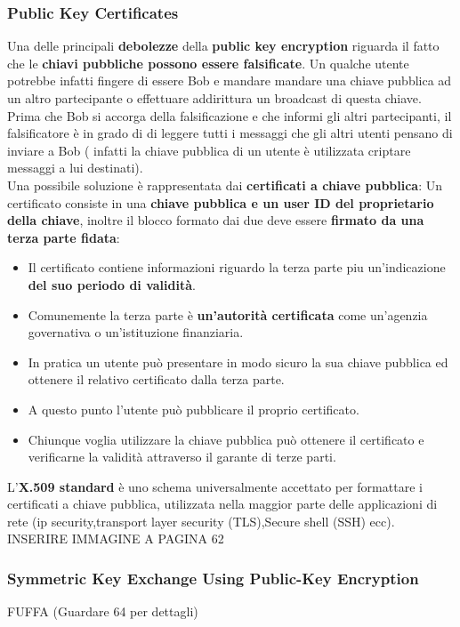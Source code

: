 \documentclass[12pt]{article}
\begin{document}
		\subsubsection{Public Key Certificates}
			Una delle principali \textbf{debolezze} della \textbf{public key encryption} riguarda il fatto che le \textbf{chiavi pubbliche possono essere falsificate}. Un qualche utente potrebbe infatti fingere di essere Bob e mandare mandare una chiave pubblica ad un altro partecipante o effettuare addirittura un broadcast di questa chiave. Prima che Bob si accorga della falsificazione e che informi gli altri partecipanti, il falsificatore è in grado di di leggere tutti i messaggi che gli altri utenti pensano di inviare a Bob ( infatti la chiave pubblica di un utente è utilizzata criptare messaggi a lui destinati).\\
			Una possibile soluzione è rappresentata dai \textbf{certificati a chiave pubblica}: Un certificato consiste in una \textbf{chiave pubblica e un user ID del proprietario della chiave}, inoltre il blocco formato dai due deve essere \textbf{firmato da una terza parte fidata}:
			\begin{itemize}
				\item Il certificato contiene informazioni riguardo la terza parte piu un'indicazione \textbf{del suo periodo di validità}.
				\item Comunemente la terza parte è \textbf{un'autorità certificata} come un'agenzia governativa o un'istituzione finanziaria.
				\item In pratica un utente può presentare in modo sicuro la sua chiave pubblica ed ottenere il relativo certificato dalla terza parte.
				\item A questo punto l'utente può pubblicare il proprio certificato.
				\item Chiunque voglia utilizzare la chiave pubblica può ottenere il certificato e verificarne la validità attraverso il garante di terze parti.
			\end{itemize} 
			L'\textbf{X.509 standard }è uno schema universalmente accettato per formattare i certificati a chiave pubblica, utilizzata nella maggior parte delle applicazioni di rete (ip security,transport layer security (TLS),Secure shell (SSH) ecc).
			INSERIRE IMMAGINE A PAGINA 62
		\subsubsection{Symmetric Key Exchange Using Public-Key Encryption}
			FUFFA (Guardare 64 per dettagli)
\end{document}
